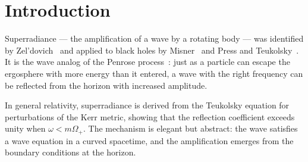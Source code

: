 \documentclass[12pt]{article}
\newcommand{\Oplus}{\Omega_+}
\newcommand{\Phiplus}{\Phi_+}
\begin{document}
\begin{abstract}
We derive superradiance from the rotating black hole azimuthal SSV
established in companion~11~\cite{c11}.  The horizon angular velocity
$\Oplus = ac/(r_+^2 + a^2)$ is the angular frequency of the SSV
broadcast at the outer horizon.  A bosonic wave of frequency $\omega$
and azimuthal quantum number $m$ is amplified when:
\begin{equation}
  \omega \;<\; m\,\Oplus,
  \label{eq:threshold_abstract}
\end{equation}
because its phase velocity is slower than the rotating SSV field
(Theorem~\ref{thm:threshold}).  The maximum extractable energy is
$(1-1/\sqrt{2})\,Mc^2 \approx 29.3\%$ of the rest mass for an
extremal Kerr black hole (Proposition~\ref{prop:max_energy}).
For the Kerr-Newman case~\cite{c12}, the threshold generalises to
$\omega < m\Oplus + q\Phiplus$ (Corollary~\ref{cor:kn}).
Superradiant instability of ultralight boson clouds produces
continuous gravitational wave signals at frequencies $f_{\rm GW}
\approx 2\mu c^2/h$ falling in the LIGO O4 band for boson masses
$\mu \sim 10^{-13}$--$10^{-12}$~eV and stellar-mass black holes.
No new postulates beyond companion~11 are required.
\end{abstract}

\section{Introduction}
\label{sec:intro}

Superradiance — the amplification of a wave by a rotating body —
was identified by Zel'dovich~\cite{zeldovich1971} and applied to
black holes by Misner~\cite{misner1972} and Press and
Teukolsky~\cite{press1972}.  It is the wave analog of the Penrose
process~\cite{penrose1969}: just as a particle can escape the ergosphere
with more energy than it entered, a wave with the right frequency
can be reflected from the horizon with increased amplitude.

In general relativity, superradiance is derived from the Teukolsky
equation for perturbations of the Kerr metric, showing that the
reflection coefficient exceeds unity when $\omega < m\Oplus$.
The mechanism is elegant but abstract: the wave satisfies a
wave equation in a curved spacetime, and the amplification emerges
from the boundary conditions at the horizon.
\end{document}
